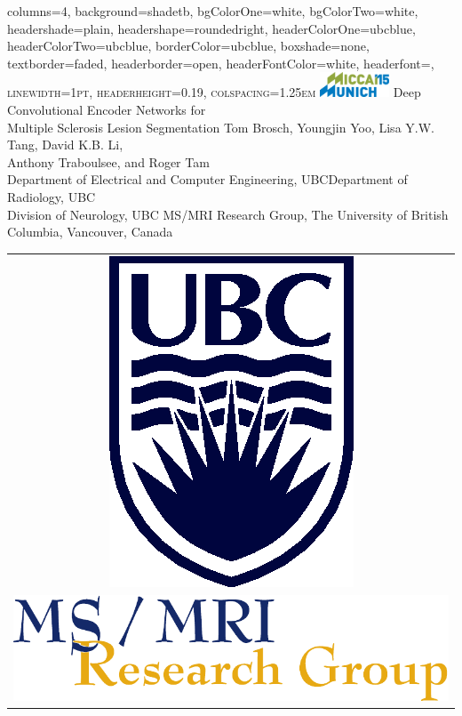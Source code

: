 \documentclass[%
portrait,paperwidth=841mm,paperheight=1180mm,%
margin=2cm,
fontscale=0.32
]{baposter}
\begin{document}
\begin{poster}{
  columns=4,
  background=shadetb,
  bgColorOne=white,
  bgColorTwo=white,
  headershade=plain,
  headershape=roundedright,
  headerColorOne=ubcblue,
  headerColorTwo=ubcblue,
  borderColor=ubcblue,
  boxshade=none,
  textborder=faded,
  headerborder=open,
  headerFontColor=white,
  headerfont=\scshape\Large,
  linewidth=1pt,
  headerheight=0.19\textwidth,
  colspacing=1.25em
}
{
\includegraphics[width=0.155\textwidth]{images/Logo_MICCAI15}
}
{
Deep Convolutional Encoder Networks for\\ Multiple Sclerosis Lesion
Segmentation\vspace{0.5em} }
{
\Large
Tom Brosch,
Youngjin Yoo,
Lisa Y.W. Tang,
David K.B. Li,\\
Anthony Traboulsee, and
Roger Tam\\[0.65ex]
\normalsize {}Department of Electrical and Computer Engineering,
UBC\quad {}Department of Radiology, UBC\\[0.65ex]
Division of Neurology, UBC\quad
{}MS/MRI Research Group, The University of British Columbia, Vancouver,
Canada
}
{
\begin{tabular}{c}
\\
\includegraphics[height=0.08\textwidth]{images/s4b282c}\\
\addlinespace
\includegraphics[height=0.038\textwidth]{images/msmri_simple}
\end{tabular}
}


\end{poster}
\end{document}
